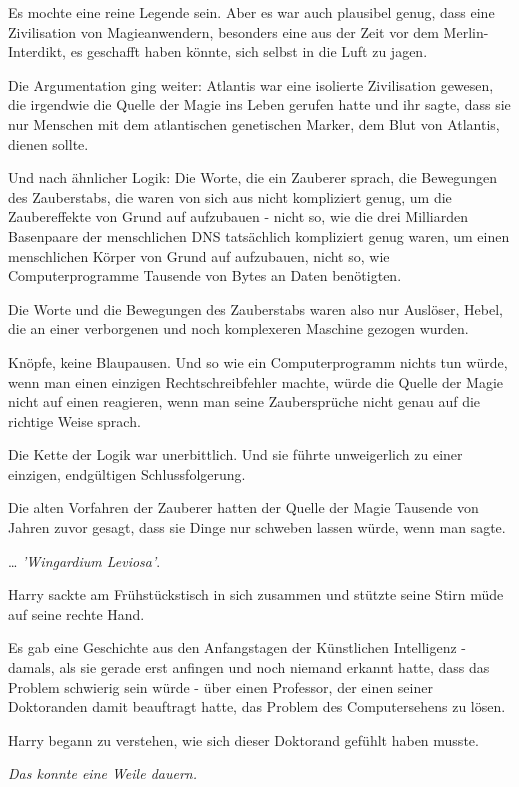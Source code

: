 {Es mochte eine reine Legende sein. Aber es war auch plausibel genug, dass eine Zivilisation von Magieanwendern, besonders eine aus der Zeit vor dem Merlin-Interdikt, es geschafft haben könnte, sich selbst in die Luft zu jagen.

Die Argumentation ging weiter: Atlantis war eine isolierte Zivilisation gewesen, die irgendwie die Quelle der Magie ins Leben gerufen hatte und ihr sagte, dass sie nur Menschen mit dem atlantischen genetischen Marker, dem Blut von Atlantis, dienen sollte.

Und nach ähnlicher Logik: Die Worte, die ein Zauberer sprach, die Bewegungen des Zauberstabs, die waren von sich aus nicht kompliziert genug, um die Zaubereffekte von Grund auf aufzubauen - nicht so, wie die drei Milliarden Basenpaare der menschlichen DNS tatsächlich kompliziert genug waren, um einen menschlichen Körper von Grund auf aufzubauen, nicht so, wie Computerprogramme Tausende von Bytes an Daten benötigten.

Die Worte und die Bewegungen des Zauberstabs waren also nur Auslöser, Hebel, die an einer verborgenen und noch komplexeren Maschine gezogen wurden.

Knöpfe, keine Blaupausen. Und so wie ein Computerprogramm nichts tun würde, wenn man einen einzigen Rechtschreibfehler machte, würde die Quelle der Magie nicht auf einen reagieren, wenn man seine Zaubersprüche nicht genau auf die richtige Weise sprach.

Die Kette der Logik war unerbittlich. Und sie führte unweigerlich zu einer einzigen, endgültigen Schlussfolgerung.

Die alten Vorfahren der Zauberer hatten der Quelle der Magie Tausende von Jahren zuvor gesagt, dass sie Dinge nur schweben lassen würde, wenn man sagte.

… \emph{'Wingardium Leviosa'}.

Harry sackte am Frühstückstisch in sich zusammen und stützte seine Stirn müde auf seine rechte Hand.

Es gab eine Geschichte aus den Anfangstagen der Künstlichen Intelligenz - damals, als sie gerade erst anfingen und noch niemand erkannt hatte, dass das Problem schwierig sein würde - über einen Professor, der einen seiner Doktoranden damit beauftragt hatte, das Problem des Computersehens zu lösen.

Harry begann zu verstehen, wie sich dieser Doktorand gefühlt haben musste.

\emph{Das konnte eine Weile dauern.}

}
